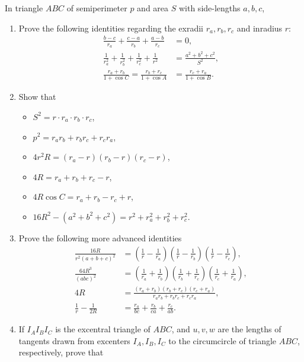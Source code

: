 \begin{tcolorbox}
\begin{question}[name={Makshud's Excentral Identities}]
        In triangle $ABC$ of semiperimeter $p$ and area $S$ with side-lengths $a,b,c$,
        \begin{enumerate}
            \item Prove the following identities regarding the exradii $r_a,r_b,r_c$ and inradius $r$:
        \begin{align*}
            \frac{b-c}{r_a}+\frac{c-a}{r_b}+\frac{a-b}{r_c} &=0,\\
            \frac{1}{r_a^2}+\frac{1}{r_b^2}+\frac{1}{r_c^2}+\frac{1}{r^2} &=\frac{a^2+b^2+c^2}{S^2},\\
            \frac{r_a+r_b}{1+\cos C} = \frac{r_b+r_c}{1+\cos A} &=\frac{r_c+r_a}{1+\cos B}.
        \end{align*}
        \item Show that
        \begin{itemize}
            \item $S^2 = r\cdot r_a \cdot r_b \cdot r_c$,
            \item $p^2 = r_ar_b+r_br_c+r_cr_a$,
            \item $4r^2R = (r_a-r)(r_b-r)(r_c-r)$,
            \item $4R = r_a+r_b+r_c-r$,
            \item $4R\cos C = r_a+r_b-r_c+r$,
            \item $16R^2-(a^2+b^2+c^2) = r^2+r_a^2+r_b^2+r_c^2$.
        \end{itemize}
        \item Prove the following more advanced identities
        \begin{align*}
            \frac{16R}{r^2(a+b+c)^2} &= \left(\frac{1}{r}-\frac{1}{r_a}\right)\left(\frac{1}{r}-\frac{1}{r_b}\right)\left(\frac{1}{r}-\frac{1}{r_c}\right),\\
            \frac{64R^3}{(abc)^2} &= \left(\frac{1}{r_a}+\frac{1}{r_b}\right)\left(\frac{1}{r_b}+\frac{1}{r_c}\right)\left(\frac{1}{r_c}+\frac{1}{r_a}\right),\\
            4R &= \frac{(r_a+r_b)(r_b+r_c)(r_c+r_a)}{r_ar_b+r_br_c+r_cr_a},\\
            \frac{1}{r} - \frac{1}{2R} &= \frac{r_a}{bc}+ \frac{r_b}{ca}+\frac{r_c}{ab}.
        \end{align*}
        \item If $I_AI_BI_C$ is the excentral triangle of $ABC$, and $u,v,w$ are the lengths of tangents drawn from excenters $I_A,I_B,I_C$ to the circumcircle of triangle $ABC$, respectively, prove that

\end{enumerate}
\end{question}
\end{tcolorbox}

